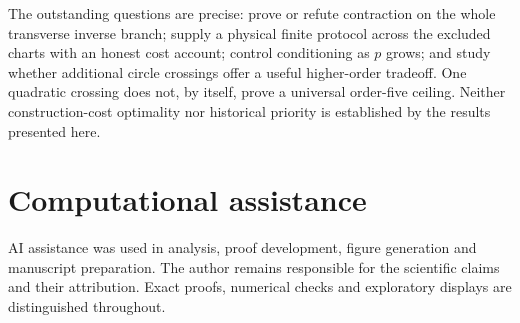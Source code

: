 \documentclass[11pt,a4paper]{article}
\theoremstyle{remark}\newtheorem{remark}[theorem]{Remark}
\begin{document}
The outstanding questions are precise: prove or refute contraction on the whole transverse inverse branch; supply a physical finite protocol across the excluded charts with an honest cost account; control conditioning as $p$ grows; and study whether additional circle crossings offer a useful higher-order tradeoff. One quadratic crossing does not, by itself, prove a universal order-five ceiling. Neither construction-cost optimality nor historical priority is established by the results presented here.

\section*{Computational assistance}
AI assistance was used in analysis, proof development, figure generation and manuscript preparation. The author remains responsible for the scientific claims and their attribution. Exact proofs, numerical checks and exploratory displays are distinguished throughout.

\begingroup
\small
\setlength{\bibsep}{3pt}


\endgroup
\end{document}
